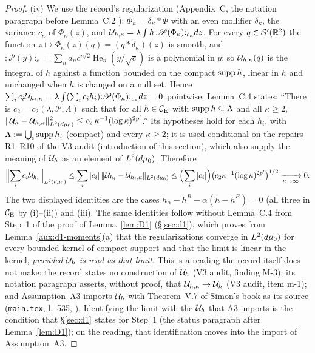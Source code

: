 \begin{proof}
(iv) We use the record's regularization (Appendix~C, the notation paragraph before Lemma~C.2
\cite[pp.~39--40]{R}): $\Phi_\kappa=\delta_\kappa*\Phi$ with an even mollifier
$\delta_\kappa$, the variance $c_\kappa$ of $\Phi_\kappa(z)$, and
$\mathcal U_{h,\kappa}=\lambda\int h\,{:}\mathscr P(\Phi_\kappa){:}_{c_\kappa}dz$.  For every
$q\in\mathcal S'(\mathbb{R}^2)$ the function $z\mapsto\Phi_\kappa(z)(q)=(q*\delta_\kappa)(z)$ is
smooth, and ${:}\mathscr P(y){:}_{c}=\sum_na_nc^{n/2}\operatorname{He}_n(y/\sqrt c)$ is a
polynomial in $y$; so $\mathcal U_{h,\kappa}(q)$ is the integral of $h$ against a function bounded
on the compact $\operatorname{supp} h$, linear in $h$ and unchanged when $h$ is changed on a null set.
Hence $\sum_ic_i\mathcal U_{h_i,\kappa}=\lambda\int(\sum_ic_ih_i){:}\mathscr
P(\Phi_\kappa){:}_{c_\kappa}dz=0$ pointwise.  Lemma~C.4 \cite[p.~40]{R} states: ``There is
$c_2=c_2(\lambda,\mathscr P,\Lambda)$ such that for all $h\in\mathcal{C}_{\mathrm E}$ with
$\operatorname{supp} h\subseteq\Lambda$ and all $\kappa\ge2$, $\|\mathcal U_h-\mathcal U_{h,\kappa}\|_{L^2(d\mu_0)}^2\le
c_2\,\kappa^{-1}(\log\kappa)^{2p'}$.''  Its hypotheses hold for each $h_i$, with
$\Lambda:=\bigcup_i\operatorname{supp} h_i$ (compact) and every $\kappa\ge2$; it is used conditional on the
repairs R1--R10 of the V3 audit (introduction of this section), which also supply the meaning of
$\mathcal U_h$ as an element of $L^2(d\mu_0)$.  Therefore
\[
 \Bigl\|\sum_ic_i\mathcal U_{h_i}\Bigr\|_{L^2(d\mu_0)}
 \le\sum_i|c_i|\,\|\mathcal U_{h_i}-\mathcal U_{h_i,\kappa}\|_{L^2(d\mu_0)}
 \le\Bigl(\sum_i|c_i|\Bigr)\bigl(c_2\kappa^{-1}(\log\kappa)^{2p'}\bigr)^{1/2}
 \xrightarrow[\kappa\to\infty]{}0 .
\]
The two displayed identities are the cases $h_\alpha-h^B-\alpha(h-h^B)=0$ (all three in
$\mathcal{C}_{\mathrm E}$ by (i)--(ii)) and (iii).  The same identities follow without Lemma~C.4 from Step~1 of the
proof of Lemma~\ref{lem:D1} (\S\ref{sec:d1}), which proves from Lemma~\ref{aux:d1-moments}(a) that
the regularizations converge in $L^2(d\mu_0)$ for every bounded kernel of compact support and that
the limit is linear in the kernel, \emph{provided $\mathcal U_h$ is read as that limit}.  This is a
reading the record itself does not make: the record states no construction of $\mathcal U_h$ (V3 audit,
finding M-3); its notation paragraph asserts, without proof, that $\mathcal U_{h,\kappa}\to\mathcal U_h$
\cite[p.~39]{R} (V3 audit, item m-1); and Assumption~A3 imports $\mathcal U_h$ with Theorem~V.7 of
Simon's book as its source (\texttt{main.tex}, l.~535, \cite[p.~8]{R}).  Identifying the limit
with the $\mathcal U_h$ that A3 imports is the condition that \S\ref{sec:d1} states for Step~1 (the status
paragraph after Lemma~\ref{lem:D1}); on the reading, that identification moves into the import of
Assumption~A3.
\end{proof}

